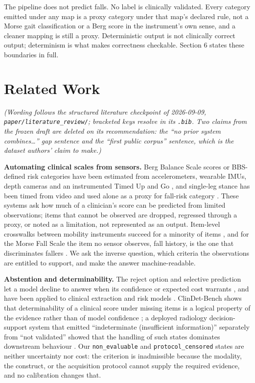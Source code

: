 \documentclass[11pt]{article}
\begin{document}
The pipeline does not predict falls. No label is clinically validated. Every category emitted under any map is a proxy category under that map's declared rule, not a Morse gait classification or a Berg score in the instrument's own sense, and a cleaner mapping is still a proxy. Deterministic output is not clinically correct output; determinism is what makes correctness checkable. Section 6 states these boundaries in full.

\section{Related Work}\label{related-work}

\emph{(Wording follows the structured literature checkpoint of 2026-09-09, \texttt{paper/literature\_review/}; bracketed keys resolve in its \texttt{.bib}. Two claims from the frozen draft are deleted on its recommendation: the ``no prior system combines\ldots{}'' gap sentence and the ``first public corpus'' sentence, which is the dataset authors' claim to make.)}

\textbf{Automating clinical scales from sensors.} Berg Balance Scale scores or BBS-defined risk categories have been estimated from accelerometers, wearable IMUs, depth cameras and an instrumented Timed Up and Go \citep{badura2016bbs,kim2021bbs,eichler2022bbs,lu2025bbs,zhang2026bbs}, and single-leg stance has been timed from video and used alone as a proxy for fall-risk category \citep{kawa2018sls,tripathy2018sls}. These systems ask how much of a clinician's score can be predicted from limited observations; items that cannot be observed are dropped, regressed through a proxy, or noted as a limitation, not represented as an output. Item-level crosswalks between mobility instruments succeed for a minority of items \citep{stenum2025mfs}, and for the Morse Fall Scale the item no sensor observes, fall history, is the one that discriminates fallers \citep{oppegaard2026mfs}. We ask the inverse question, which criteria the observations are entitled to support, and make the answer machine-readable.

\textbf{Abstention and determinability.} The reject option and selective prediction let a model decline to answer when its confidence or expected cost warrants \citep{chow1970,elyaniv2010,geifman2017,mozannar2020}, and have been applied to clinical extraction and risk models \citep{kompa2021,swaminathan2023}. ClinDet-Bench shows that determinability of a clinical score under missing items is a logical property of the evidence rather than of model confidence \citep{watanabe2026clindet}; a deployed radiology decision-support system that emitted ``indeterminate (insufficient information)'' separately from ``not validated'' showed that the handling of such states dominates downstream behaviour \citep{schneider2015}. Our \texttt{non\_evaluable} and \texttt{protocol\_censored} states are neither uncertainty nor cost: the criterion is inadmissible because the modality, the construct, or the acquisition protocol cannot supply the required evidence, and no calibration changes that.
\end{document}
